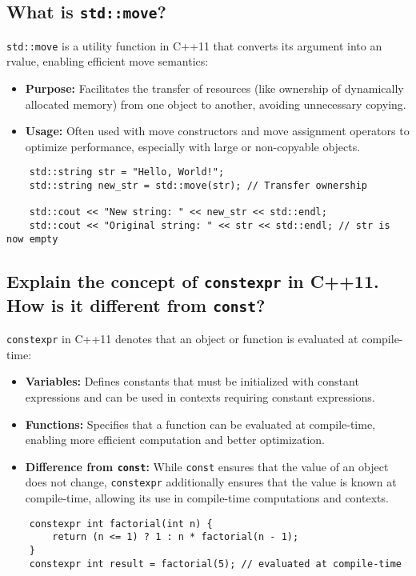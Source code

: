 \subsection{What is \texttt{std::move}?}
\texttt{std::move} is a utility function in C++11 that converts its argument into an rvalue, enabling efficient move semantics:
\begin{itemize}
    \item \textbf{Purpose:} Facilitates the transfer of resources (like ownership of dynamically allocated memory) from one object to another, avoiding unnecessary copying.
    \item \textbf{Usage:} Often used with move constructors and move assignment operators to optimize performance, especially with large or non-copyable objects.
\end{itemize}
\begin{tcolorbox}[title=\texttt{std::move} Example]
\begin{verbatim}
    std::string str = "Hello, World!";
    std::string new_str = std::move(str); // Transfer ownership

    std::cout << "New string: " << new_str << std::endl;
    std::cout << "Original string: " << str << std::endl; // str is now empty
\end{verbatim}
\end{tcolorbox}

\subsection{Explain the concept of \texttt{constexpr} in C++11. How is it different from \texttt{const}?}
\texttt{constexpr} in C++11 denotes that an object or function is evaluated at compile-time:
\begin{itemize}
    \item \textbf{Variables:} Defines constants that must be initialized with constant expressions and can be used in contexts requiring constant expressions.
    \item \textbf{Functions:} Specifies that a function can be evaluated at compile-time, enabling more efficient computation and better optimization.
    \item \textbf{Difference from \texttt{const}:} While \texttt{const} ensures that the value of an object does not change, \texttt{constexpr} additionally ensures that the value is known at compile-time, allowing its use in compile-time computations and contexts.
\end{itemize}
\begin{tcolorbox}[title=\texttt{constexpr} Example]
\begin{verbatim}
    constexpr int factorial(int n) {
        return (n <= 1) ? 1 : n * factorial(n - 1);
    }
    constexpr int result = factorial(5); // evaluated at compile-time
\end{verbatim}
\end{tcolorbox}
\subsection{}